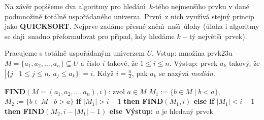 \documentclass[a4paper,12pt]{article}
\begin{document}
\centerline{}
\bigskip

\flushpar Na z\'av\v er pop\'\i\v seme dva algoritmy pro hled\'an\'\i\ $
k$-t\'eho 
nejmen\v s\'\i\-ho prvku v dan\'e podmno\v zin\v e tot\'aln\v e 
uspo\v r\'adan\'e\-ho univerza. Prv\-n\'\i\ z nich vyu\v z\'\i v\'a  
stejn\'y princip jako {\bf QUICKSORT}. Nejprve zad\'ame 
p\v resn\'e zn\v e\-n\'\i\ na\v s\'\i\ \'ulohy (\'uloha i algoritmy se daj\'\i\ 
snadno p\v reformulovat pro p\v r\'\i pad, kdy hled\'ame $k-$t\'y 
nejv\v et\v s\'\i\ prvek).
\medskip

\flushpar Pracujeme s tot\'aln\v e uspo\v r\'adan\'ym univerzem $
U$.\newline 
Vstup: mno\v zina prvk\accent23u $M=\{a_1,a_2,\dots,a_n\}\subseteq 
U$ a \v c\'\i slo $i$ takov\'e, 
\v ze $1\le i\le n$.\newline 
V\'ystup: prvek $a_k$ takov\'y, \v ze 
$|\{j\mid 1\le j\le n,\,a_j\le a_k\}|=i$.\newline 
Kdy\v z $i=\frac n2$, pak $a_k$ se naz\'yv\'a \emph{medi\'an}.
\bigskip

{\bf FIND$(M=(a_1,a_2,\dots,a_n),i)$}:\newline 
zvol $a\in M$\newline
$M_1:=\{b\in M\mid b<a\}$, 
$M_2:=\{b\in M\mid b>a\}$\newline 
{\bf if} $|M_1|>i-1$ {\bf then\newline 
\phantom{{\rm ---}}FIND$(M_1,i)$\newline 
else\newline 
\phantom{{\rm ---}}if} $|M_1|<i-1$ {\bf then\newline 
\phantom{{\rm ------}}FIND$(M_2,i-|M_1|-1)$\newline 
\phantom{{\rm ---}}else\newline 
\phantom{{\rm------}}V\'ystup: $a$} je hledan\'y prvek\newline 
\phantom{---}{\bf endif\newline 
endif}
\bigskip
\end{document}
